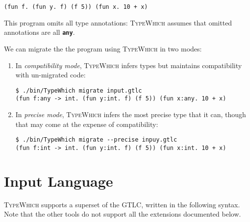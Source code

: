 \documentclass{book}
\newcommand{\system}{\textsc{TypeWhich}\xspace}
\newcommand{\kw}[1]{\textbf{\texttt{#1}}}
\begin{document}
\begin{verbatim}
(fun f. (fun y. f) (f 5)) (fun x. 10 + x)
\end{verbatim}

This program omits all type annotations: \system assumes that omitted
annotations are all \kw{any}.

We can migrate the the program using \system in two modes:

\begin{enumerate}

\item In \emph{compatibility mode}, \system infers types but maintains
compatibility with un-migrated code:

\begin{verbatim}
$ ./bin/TypeWhich migrate input.gtlc
(fun f:any -> int. (fun y:int. f) (f 5)) (fun x:any. 10 + x)
\end{verbatim}

\item In \emph{precise mode}, \system infers the most precise type that it
can, though that may come at the expense of compatibility:

\begin{verbatim}
$ ./bin/TypeWhich migrate --precise inpuy.gtlc
(fun f:int -> int. (fun y:int. f) (f 5)) (fun x:int. 10 + x)
\end{verbatim}
     
\end{enumerate}

\section{Input Language}\label{input-lang-gtlc}

\system supports a superset of the GTLC, written in the following syntax. Note
that the other tools do not support all the extensions documented below.
\end{document}
